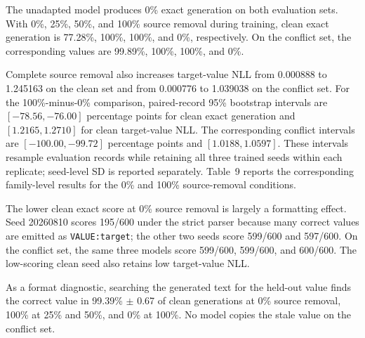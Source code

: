 \documentclass[pdflatex,sn-basic,Numbered]{sn-jnl}
\begin{document}
\begin{appendices}
\begin{table}[ht]
\centering
\caption{
Controlled-model results, reported as mean $\pm$ optimization-seed SD across three seeds.
Exact generation requires the prespecified \texttt{VALUE=} field. NLL is computed over
target-value tokens.
}
\resizebox{\textwidth}{!}{}
\end{table}

The unadapted model produces 0\% exact generation on both evaluation sets. With 0\%, 25\%,
50\%, and 100\% source removal during training, clean exact generation is 77.28\%, 100\%,
100\%, and 0\%, respectively. On the conflict set, the corresponding values are 99.89\%,
100\%, 100\%, and 0\%.

Complete source removal also increases target-value NLL from 0.000888 to 1.245163 on the clean
set and from 0.000776 to 1.039038 on the conflict set. For the 100\%-minus-0\% comparison,
paired-record 95\% bootstrap intervals are $[-78.56,-76.00]$ percentage points for clean exact
generation and $[1.2165,1.2710]$ for clean target-value NLL. The corresponding conflict intervals
are $[-100.00,-99.72]$ percentage points and $[1.0188,1.0597]$. These intervals resample
evaluation records while retaining all three trained seeds within each replicate; seed-level SD
is reported separately.
Table~9 reports the corresponding family-level results for the 0\% and 100\% source-removal conditions.

\begin{table}[ht]
\centering
\caption{
Family-level results for the 0\% and 100\% source-removal conditions. The lower strict clean
score at 0\% includes the output-format variation observed in one optimization seed.
}
\resizebox{\textwidth}{!}{}
\end{table}

The lower clean exact score at 0\% source removal is largely a formatting effect. Seed 20260810
scores 195/600 under the strict parser because many correct values are emitted as
\texttt{VALUE:target}; the other two seeds score 599/600 and 597/600. On the conflict set, the
same three models score 599/600, 599/600, and 600/600. The low-scoring clean seed also retains
low target-value NLL.

As a format diagnostic, searching the generated text for the held-out value finds the correct
value in 99.39\% $\pm$ 0.67 of clean generations at 0\% source removal, 100\% at 25\% and
50\%, and 0\% at 100\%. No model copies the stale value on the conflict set.
\end{appendices}


\end{document}
